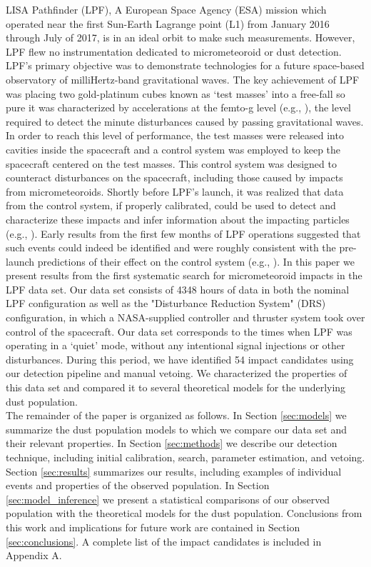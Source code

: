 \documentclass[twocolumn, trackchanges]{aastex62}
\newcommand{\nhits}{54 } %
\newcommand{\nhours}{4348 }
\begin{document}
LISA Pathfinder (LPF), A European Space Agency (ESA) mission which operated near the first Sun-Earth Lagrange point (L1) from January 2016 through July of 2017, is in an ideal orbit to make such measurements. However, LPF flew no instrumentation dedicated to micrometeoroid or dust detection.  LPF's primary objective was to demonstrate technologies for a future space-based observatory of milliHertz-band gravitational waves. The key achievement of LPF was placing two gold-platinum cubes known as `test masses' into a free-fall so pure it was characterized by accelerations at the femto-g level (e.g., \cite{LPF_PRL_2016, LPF_PRL_2018}), the level required to detect the minute disturbances caused by passing gravitational waves. In order to reach this level of performance, the test masses were released into cavities inside the spacecraft and a control system was employed to keep the spacecraft centered on the test masses.  This control system was designed to counteract disturbances on the spacecraft, including those caused by impacts from micrometeoroids. Shortly before LPF's launch, it was realized that data from the control system, if properly calibrated, could be used to detect and characterize these impacts and infer information about the impacting particles (e.g., \cite{Thorpe:2015cxa}). Early results from the first few months of LPF operations suggested that such events could indeed be identified and were roughly consistent with the pre-launch predictions of their effect on the control system (e.g., \cite{Thorpe2017a}). In this paper we present results from the first systematic search for micrometeoroid impacts in the LPF data set.  Our data set consists of \nhours hours of data in both the nominal LPF configuration as well as the "Disturbance Reduction System" (DRS) configuration, in which a NASA-supplied controller and thruster system took over control of the spacecraft. Our data set corresponds to the times when LPF was operating in a `quiet' mode, without any intentional signal injections or other disturbances. During this period, we have identified \nhits impact candidates using our detection pipeline and manual vetoing. We characterized the properties of this data set and compared it to several theoretical models for the underlying dust population. 
\\
The remainder of the paper is organized as follows. In Section \ref{sec:models} we summarize the dust population models to which we compare our data set and their relevant properties. In Section \ref{sec:methods} we describe our detection technique, including initial calibration, search, parameter estimation, and vetoing. Section \ref{sec:results} summarizes our results, including examples of individual events and properties of the observed population. In Section \ref{sec:model_inference} we present a statistical comparisons of our observed population with the theoretical models for the dust population. Conclusions from this work and implications for future work are contained in Section \ref{sec:conclusions}. A complete list of the impact candidates is included in Appendix A. 
\end{document}
